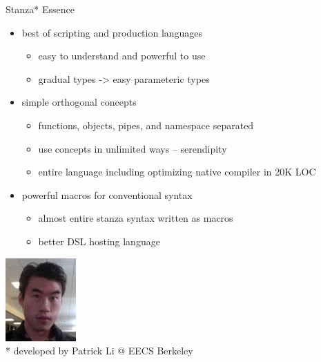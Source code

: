 \documentclass[xcolor=pdflatex,dvipsnames,table]{beamer}
\begin{document}
\begin{frame}[fragile]{Stanza* Essence}
\begin{itemize}
\item best of scripting and production languages
\begin{itemize}
\item easy to understand and powerful to use
\item gradual types -> easy parameteric types
\end{itemize}
\item simple orthogonal concepts
\begin{itemize}
\item functions, objects, pipes, and namespace separated
\item use concepts in unlimited ways -- serendipity
\item entire language including optimizing native compiler in 20K LOC
\end{itemize}
\item powerful macros for conventional syntax
\begin{itemize}
\item almost entire stanza syntax written as macros
\item better DSL hosting language
\end{itemize}
\end{itemize}
\vspace{0.25cm}
\begin{center}
\includegraphics[height=0.2\textheight]{figs/patrick.jpg} \\
* developed by Patrick Li @ EECS Berkeley
\end{center}
\end{frame}
\end{document}
